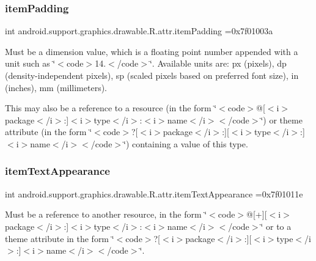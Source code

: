 \subsubsection{\texorpdfstring{item\+Padding}{itemPadding}}
{\footnotesize\ttfamily int android.\+support.\+graphics.\+drawable.\+R.\+attr.\+item\+Padding =0x7f01003a\hspace{0.3cm}{\ttfamily [static]}}

Must be a dimension value, which is a floating point number appended with a unit such as \char`\"{}$<$code$>$14.\+5sp$<$/code$>$\char`\"{}. Available units are\+: px (pixels), dp (density-\/independent pixels), sp (scaled pixels based on preferred font size), in (inches), mm (millimeters). 

This may also be a reference to a resource (in the form \char`\"{}$<$code$>$@\mbox{[}$<$i$>$package$<$/i$>$\+:\mbox{]}$<$i$>$type$<$/i$>$\+:$<$i$>$name$<$/i$>$$<$/code$>$\char`\"{}) or theme attribute (in the form \char`\"{}$<$code$>$?\mbox{[}$<$i$>$package$<$/i$>$\+:\mbox{]}\mbox{[}$<$i$>$type$<$/i$>$\+:\mbox{]}$<$i$>$name$<$/i$>$$<$/code$>$\char`\"{}) containing a value of this type. \mbox{\label{classandroid_1_1support_1_1graphics_1_1drawable_1_1R_1_1attr_ac97720f26eccd2c5a5b72930a9297912}} 
\subsubsection{\texorpdfstring{item\+Text\+Appearance}{itemTextAppearance}}
{\footnotesize\ttfamily int android.\+support.\+graphics.\+drawable.\+R.\+attr.\+item\+Text\+Appearance =0x7f01011e\hspace{0.3cm}{\ttfamily [static]}}

Must be a reference to another resource, in the form \char`\"{}$<$code$>$@\mbox{[}+\mbox{]}\mbox{[}$<$i$>$package$<$/i$>$\+:\mbox{]}$<$i$>$type$<$/i$>$\+:$<$i$>$name$<$/i$>$$<$/code$>$\char`\"{} or to a theme attribute in the form \char`\"{}$<$code$>$?\mbox{[}$<$i$>$package$<$/i$>$\+:\mbox{]}\mbox{[}$<$i$>$type$<$/i$>$\+:\mbox{]}$<$i$>$name$<$/i$>$$<$/code$>$\char`\"{}. \mbox{\label{classandroid_1_1support_1_1graphics_1_1drawable_1_1R_1_1attr_aa9c6b70d39d287b5016e76134718fca8}} 
